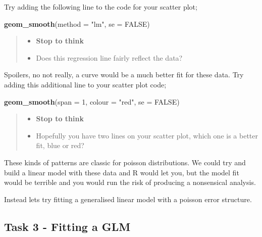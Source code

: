 \documentclass[
]{book}
\newenvironment{Shaded}{\begin{snugshade}}{\end{snugshade}}
\newcommand{\AttributeTok}[1]{\textcolor[rgb]{0.13,0.29,0.53}{#1}}
\newcommand{\ConstantTok}[1]{\textcolor[rgb]{0.56,0.35,0.01}{#1}}
\newcommand{\DecValTok}[1]{\textcolor[rgb]{0.00,0.00,0.81}{#1}}
\newcommand{\FunctionTok}[1]{\textcolor[rgb]{0.13,0.29,0.53}{\textbf{#1}}}
\newcommand{\NormalTok}[1]{#1}
\newcommand{\StringTok}[1]{\textcolor[rgb]{0.31,0.60,0.02}{#1}}
\providecommand{\tightlist}{%
  \setlength{\itemsep}{0pt}\setlength{\parskip}{0pt}}
\begin{document}
Try adding the following line to the code for your scatter plot;

\begin{Shaded}
\begin{Highlighting}[]
\FunctionTok{geom\_smooth}\NormalTok{(}\AttributeTok{method =} \StringTok{"lm"}\NormalTok{, }\AttributeTok{se =} \ConstantTok{FALSE}\NormalTok{)}
\end{Highlighting}
\end{Shaded}

\begin{quote}
\begin{itemize}
\tightlist
\item
  \textbf{Stop to think}
\item
  Does this regression line fairly reflect the data?
\end{itemize}
\end{quote}

Spoilers, no not really, a curve would be a much better fit for these data. Try adding this additional line to your scatter plot code;

\begin{Shaded}
\begin{Highlighting}[]
\FunctionTok{geom\_smooth}\NormalTok{(}\AttributeTok{span =} \DecValTok{1}\NormalTok{, }\AttributeTok{colour =} \StringTok{"red"}\NormalTok{, }\AttributeTok{se =} \ConstantTok{FALSE}\NormalTok{)}
\end{Highlighting}
\end{Shaded}

\begin{quote}
\begin{itemize}
\tightlist
\item
  \textbf{Stop to think}
\item
  Hopefully you have two lines on your scatter plot, which one is a better fit, blue or red?
\end{itemize}
\end{quote}

These kinds of patterns are classic for poisson distributions. We could try and build a linear model with these data and R would let you, but the model fit would be terrible and you would run the risk of producing a nonsensical analysis.

Instead lets try fitting a generalised linear model with a poisson error structure.

\subsection{Task 3 - Fitting a GLM}\label{task-3---fitting-a-glm}
\end{document}
